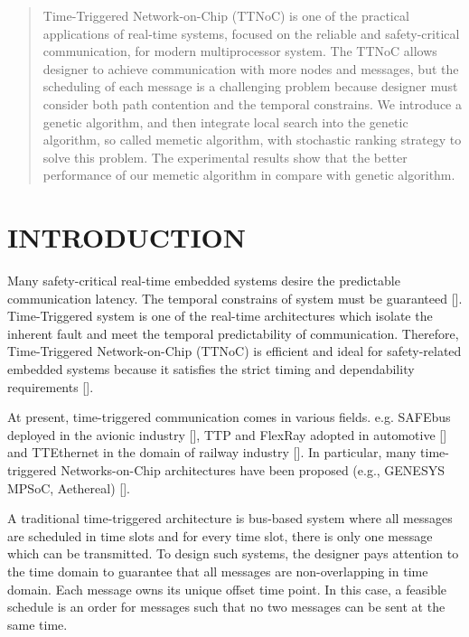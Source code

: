 \documentclass[conference]{IEEEtran}
\begin{document}
\begin{abstract}
Time-Triggered Network-on-Chip (TTNoC) is one of the practical applications of real-time systems, focused on the reliable and safety-critical communication, for modern multiprocessor system. The TTNoC allows designer to achieve communication with more nodes and messages, but the scheduling of each message is a challenging problem because designer must consider both path contention and the temporal constrains. We introduce a genetic algorithm, and then integrate local search into the genetic algorithm, so called memetic algorithm, with stochastic ranking strategy to solve this problem. The experimental results show that the better performance of our memetic algorithm in compare with genetic algorithm.
\end{abstract}

%
\IEEEpeerreviewmaketitle



\section{INTRODUCTION}
Many safety-critical real-time embedded systems desire the predictable communication latency. The temporal constrains of system must be guaranteed []. Time-Triggered system is one of the real-time architectures which isolate the inherent fault and meet the temporal predictability of communication. Therefore, Time-Triggered Network-on-Chip (TTNoC) is efficient and ideal for safety-related embedded systems because it satisfies the strict timing and dependability requirements [].

At present, time-triggered communication comes in various fields. e.g. SAFEbus deployed in the avionic industry [], TTP and FlexRay adopted in automotive  [] and TTEthernet in the domain of railway industry []. In particular, many time-triggered Networks-on-Chip architectures have been proposed (e.g., GENESYS MPSoC, Aethereal) [].

A traditional time-triggered architecture is bus-based system where all messages are scheduled in time slots and for every time slot, there is only one message which can be transmitted. To design such systems, the designer pays attention to the time domain to guarantee that all messages are non-overlapping in time domain. Each message owns its unique offset time point. In this case, a feasible schedule is an order for messages such that no two messages can be sent at the same time. 
\end{document}
